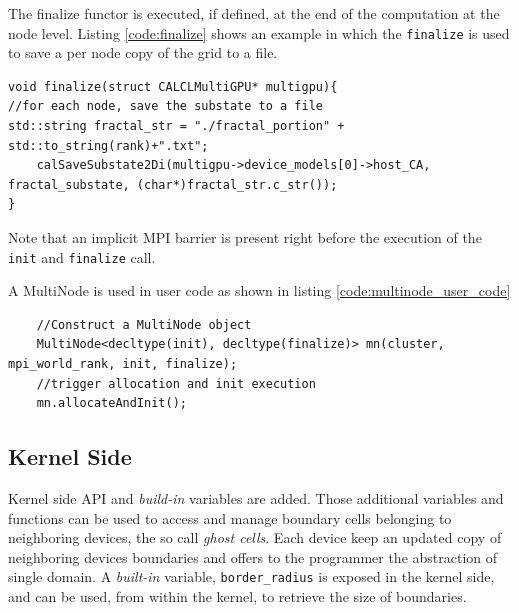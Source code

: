 The finalize functor is executed, if defined, at the end of the computation at the node level. Listing \ref{code:finalize} shows an example in which the \texttt{finalize} is used to save a per node copy of the grid to a file.
\begin{lstlisting}
void finalize(struct CALCLMultiGPU* multigpu){
//for each node, save the substate to a file
std::string fractal_str = "./fractal_portion" + std::to_string(rank)+".txt";
	calSaveSubstate2Di(multigpu->device_models[0]->host_CA, fractal_substate, (char*)fractal_str.c_str());
}
\end{lstlisting}
Note that an implicit MPI barrier is present right before the execution of the \texttt{init} and \texttt{finalize} call.

A MultiNode is used in user code as shown in listing \ref{code:multinode_user_code}

\begin{lstlisting}
	//Construct a MultiNode object
	MultiNode<decltype(init), decltype(finalize)> mn(cluster, mpi_world_rank, init, finalize);
	//trigger allocation and init execution
	mn.allocateAndInit();
\end{lstlisting}

\subsection{Kernel Side }
Kernel side  API  and \textit{build-in} variables are added. Those additional variables and functions can be used to access and manage boundary cells belonging to neighboring devices, the so call \textit{ghost cells}. Each device keep an updated copy of  neighboring devices boundaries and offers to the programmer the abstraction of single domain. A \textit{built-in} variable, \texttt{border\_radius} is exposed in the kernel side, and can be used, from within the kernel, to retrieve the size of boundaries.


